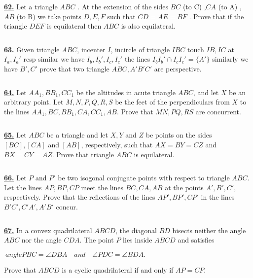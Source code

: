 \documentclass{article}
\begin{document}
$$ $$

\href{ http://www.artofproblemsolving.com/Forum/viewtopic.php?p=515828&#p515828
}{\bf 62.} Let a triangle $ABC$ . At the extension of the sides  $BC$ (to C) ,$CA$ (to A) , $AB$ (to B) we take points  $D,E,F$  such that  $CD=AE=BF$ .
Prove that if the triangle $DEF$  is   equilateral  then $ABC$ is also equilateral.


$$ $$

\href{http://www.artofproblemsolving.com/Forum/viewtopic.php?p=744569#p744569
 }{\bf 63.} Given triangle $ABC$, incenter $I$, incircle of triangle $IBC$ touch $IB,IC$ at $I_{a},I_{a}'$ resp similar we have $I_{b},I_{b}',I_{c},I_{c}'$ the lines $I_{b}I_{b}'\cap I_{c}I_{c}'=\{A'\}$ similarly we have $B',C'$ prove that two triangle $ABC,A'B'C'$ are perspective.

$$ $$


\href{ http://www.artofproblemsolving.com/Forum/viewtopic.php?p=715139#p715139
}{\bf 64.} Let $ AA_{1},BB_{1},CC_{1}$ be the altitudes in acute triangle $ ABC$, and let $ X$ be an arbitrary point. Let $ M,N,P,Q,R,S$ be the feet of the perpendiculars from $ X$ to the lines $ AA_{1},BC,BB_{1},CA,CC_{1},AB$. Prove that $ MN,PQ,RS$ are concurrent.


$$ $$

\href{http://www.artofproblemsolving.com/Forum/viewtopic.php?p=558585#p558585
 }{\bf 65.} Let  $ABC$ be a triangle and let $X,Y$ and $Z$ be points on the sides $[BC],[CA]$ and $[AB]$, respectively, such that $AX=BY=CZ$ and $BX=CY=AZ.$ Prove that triangle $ABC$ is equilateral.


$$ $$

\href{ http://www.artofproblemsolving.com/Forum/viewtopic.php?p=124095#p124095
}{\bf 66.} Let $P$ and $P'$ be two isogonal conjugate points with respect to triangle $ABC.$ Let the lines $AP, BP, CP$ meet the lines $BC, CA, AB$ at the points $A', B', C'$, respectively.
Prove that the reflections of the lines $AP', BP', CP'$ in the lines $B'C', C'A', A'B'$ concur.


$$ $$

\href{http://www.artofproblemsolving.com/Forum/viewtopic.php?p=99759#p99759
 }{\bf 67.} In a convex quadrilateral $ABCD$, the diagonal $BD$ bisects neither the angle $ABC$ nor the angle $CDA$. The point $P$ lies inside $ABCD$ and satisfies

$\ angle PBC=\angle DBA\quad and \quad \angle PDC=\angle BDA. $

Prove that $ABCD$ is a cyclic quadrilateral if and only if $AP=CP$.
\end{document}
